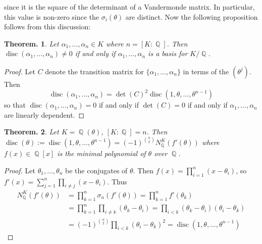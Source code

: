 \documentclass[11pt, a4paper]{memoir}
\DeclareMathOperator{\Q}{{\mathbb{Q}}}
\theoremstyle{change}
\newtheorem{theorem}{Theorem.}[section]
\theoremstyle{plain}
\theoremstyle{nonumberplain}
\newtheorem{proof}{Proof}
\DeclareMathOperator{\disc}{disc}
\numberwithin{equation}{section}
\begin{document}
since it is the square of the determinant of a Vandermonde matrix.
In particular, this value is non-zero since the $\sigma_i(\theta)$ are distinct.
Now the following proposition follows from this discussion:
\begin{theorem}
    Let $\alpha_1,\ldots,\alpha_n\in K$ where $n=[K:\Q]$.
    Then $\disc(\alpha_1,\ldots,\alpha_n)\neq 0$ if and only if $\alpha_1,\ldots,\alpha_n$ is a basis for $K/\Q$.
\end{theorem}
\begin{proof}
    Let $C$ denote the transition matrix for $\{\alpha_1,\ldots,\alpha_n\}$ in terms of the $(\theta^j)$.
    Then
    \begin{equation*}
        \disc(\alpha_1,\ldots,\alpha_n)=\det(C)^2\disc(1,\theta,\ldots,\theta^{n-1})
    \end{equation*}
    so that $\disc(\alpha_1,\ldots,\alpha_n)=0$ if and only if $\det(C)=0$ if and only if $\alpha_1,\ldots,\alpha_n$ are linearly dependent.
\end{proof}
\begin{theorem}\label{thm:disc-pb}
    Let $K=\Q(\theta)$, $[K:\Q]=n$.
    Then $\disc(\theta):=\disc(1,\theta,\ldots,\theta^{n-1})=(-1)^{\binom{n}{2}}N_{\Q}^K(f'(\theta))$ where $f(x)\in\Q[x]$ is the minimal polynomial of $\theta$ over $\Q$.
\end{theorem}
\begin{proof}
    Let $\theta_1,\ldots,\theta_n$ be the conjugates of $\theta$.
    Then $f(x)=\prod_{i=1}^n(x-\theta_i)$, so $f'(x)=\sum_{j=1}^n\prod_{i\neq j}(x-\theta_i)$.
    Thus
    \begin{align*}
        N_{\Q}^K(f'(\theta))&=\prod_{k=1}^n\sigma_n(f'(\theta)) = \prod_{k=1}^n f'(\theta_k)\\
                            &= \prod_{k=1}^n\prod_{i\neq k}(\theta_k-\theta_i)= \prod_{i<k}(\theta_k-\theta_i)(\theta_i-\theta_k)\\
                            &= (-1)^{\binom{n}{2}}\prod_{i<k}(\theta_i-\theta_k)^2= \disc(1,\theta,\ldots,\theta^{n-1})
    \end{align*}
\end{proof}
\end{document}
